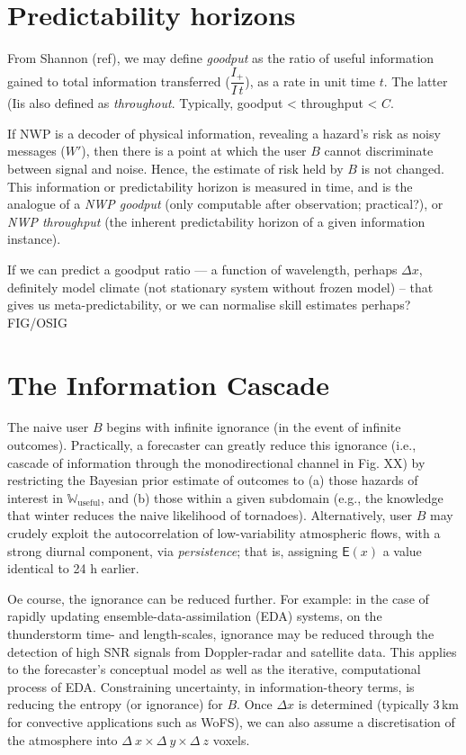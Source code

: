 \documentclass{ametsoc}
\newcommand*{\expect}{\mathsf{E}}
\def\lt{\textless}
\def\dx{$\Delta x$}
\begin{document}
\section{Predictability horizons}
From Shannon (ref), we may define \emph{goodput} as the ratio of useful information gained to total information transferred ($\dfrac{I_+}{I\,t}$), as a rate in unit time $t$. The latter (Iis also defined as \emph{throughout}. Typically, goodput \lt{} throughput \lt{} $C$. 

If NWP is a decoder of physical information, revealing a hazard's risk as noisy messages ($W'$), then there is a point at which the user $B$ cannot discriminate between signal and noise. Hence, the estimate of risk held by $B$ is not changed. This information or predictability horizon is measured in time, and is the analogue of a \emph{NWP goodput} (only computable after observation; practical?), or \emph{NWP throughput} (the inherent predictability horizon of a given information instance).

If we can predict a goodput ratio --- a function of wavelength, perhaps \dx, definitely model climate (not stationary system without frozen model) -- that gives us meta-predictability, or we can normalise skill estimates perhaps? FIG/OSIG

\section{The Information Cascade}
The naive user $B$ begins with infinite ignorance (in the event of infinite outcomes). Practically, a forecaster can greatly reduce this ignorance (i.e., cascade of information through the monodirectional channel in Fig. XX) by restricting the Bayesian prior estimate of outcomes to (a) those hazards of interest in $\mathbb{W}_\textrm{useful}$, and (b) those within a given subdomain (e.g., the knowledge that winter reduces the naive likelihood of tornadoes). Alternatively, user $B$ may crudely exploit the autocorrelation of low-variability atmospheric flows, with a strong diurnal component, via \emph{persistence}; that is, assigning $\expect(x)$ a value identical to 24 h earlier.

Oe course, the ignorance can be reduced further. For example: in the case of rapidly updating ensemble-data-assimilation (EDA) systems, on the thunderstorm time- and length-scales, ignorance may be reduced through the detection of high SNR signals from Doppler-radar and satellite data. This applies to the forecaster's conceptual model as well as the iterative, computational process of EDA. Constraining uncertainty, in information-theory terms, is reducing the entropy (or ignorance) for $B$. Once \dx{} is determined (typically 3\,km for convective applications such as WoFS), we can also assume a discretisation of the atmosphere into $\Delta~x \times \Delta~y \times \Delta~z$ voxels. 
\end{document}
